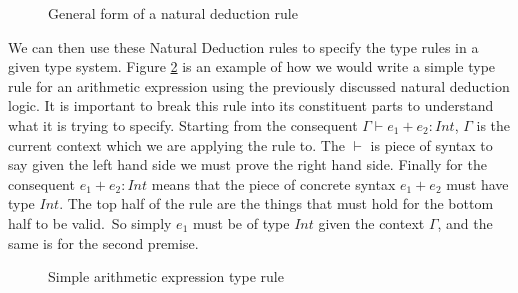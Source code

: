 \begin{figure}[H]
    \begin{prooftree}
    \end{prooftree}
    \caption{General form of a natural deduction rule}
    \label{fig:generalNatDectRule}
\end{figure}

We can then use these Natural Deduction rules to specify the type rules in a given type system\cite{ranta2012implementing,cardelli1996type,}.
Figure \ref{fig:simpleTypeRule} is an example of how we would write a simple type rule for an arithmetic expression using the previously discussed natural deduction logic.
It is important to break this rule into its constituent parts to understand what it is trying to specify.
Starting from the consequent $\Gamma \vdash e_1 + e_2 : Int$, $\Gamma$ is the current context which we are applying the rule to.
The $\vdash$ is piece of syntax to say given the left hand side we must prove the right hand side.
Finally for the consequent $e_1 + e_2 : Int$ means that the piece of concrete syntax $e_1 + e_2$ must have type $Int$.
The top half of the rule are the things that must hold for the bottom half to be valid.\
So simply $e_1$ must be of type $Int$ given the context $\Gamma$, and the same is for the second premise\cite{cardelli1996type,ranta2012implementing}.

\begin{figure}[H]
    \begin{prooftree}
    \end{prooftree}
    \caption{Simple arithmetic expression type rule}
    \label{fig:simpleTypeRule}
\end{figure}
